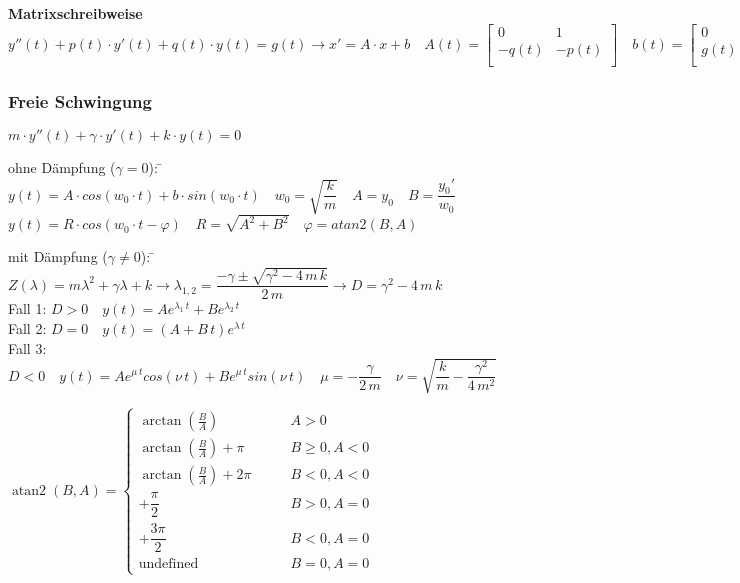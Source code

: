\textbf{Matrixschreibweise}\\
$ y''(t) + p(t)\cdot y'(t) + q(t) \cdot y(t) = g(t) \rightarrow x' = A \cdot x + b \quad 
A(t)=\begin{bmatrix}
 0 & 1 \\
 -q(t) & -p(t)\\
\end{bmatrix} \quad
b(t)=\begin{bmatrix}
 0 \\
 g(t)\\
\end{bmatrix}$

\subsubsection{Freie Schwingung}
$m \cdot y''(t) + \gamma\cdot y'(t) + k \cdot y(t) = 0$\\
\begin{tabbing}
ohne Dämpfung ($\gamma = 0$): \= $y(t) = A \cdot cos(w_0 \cdot t) + b\cdot sin(w_0 \cdot t) \quad w_0=\sqrt{\dfrac{k}{m}} \quad  A=y_0 \quad B=\dfrac{y_0'}{w_0}$\\
\>$y(t) =R\cdot cos(w_0 \cdot t - \varphi) \quad R=\sqrt{A^2+B^2} \quad \varphi=atan2(B,A)$\\
\end{tabbing}

\begin{tabbing}
mit Dämpfung ($\gamma \neq 0$): \= $Z(\lambda)=m\lambda^2 + \gamma \lambda + k \rightarrow \lambda_{1,2}=\dfrac{-\gamma \pm \sqrt{\gamma^2 - 4 \, m \, k}}{2 \, m} \rightarrow D=\gamma^2 - 4 \, m \, k$\\
\> Fall 1: $D>0 \quad y(t)=Ae^{\lambda_1 \, t} + Be^{\lambda_2 \, t}$\\
\> Fall 2: $D=0 \quad y(t)=(A + B \,t)e^{\lambda \, t}$\\
\> Fall 3: $D<0 \quad y(t)=Ae^{\mu \, t}cos(\nu \, t) + Be^{\mu \, t}sin(\nu \, t) \quad \mu=-\dfrac{\gamma}{2\,m} \quad \nu = \sqrt{\dfrac{k}{m}-\dfrac{\gamma^2}{4 \, m^2}}$
\end{tabbing}

$\operatorname{atan2}(B, A) = \begin{cases}
\arctan\left(\frac B A\right) & \qquad A > 0 \\
\arctan\left(\frac B A\right) + \pi& \qquad B \ge 0 , A < 0 \\
\arctan\left(\frac B A\right) + 2\pi& \qquad B < 0 , A < 0 \\
+\dfrac{\pi}{2} & \qquad B > 0 , A = 0 \\
+\dfrac{3\pi}{2} & \qquad B < 0 , A = 0 \\
\text{undefined} & \qquad B = 0, A = 0
\end{cases}$

